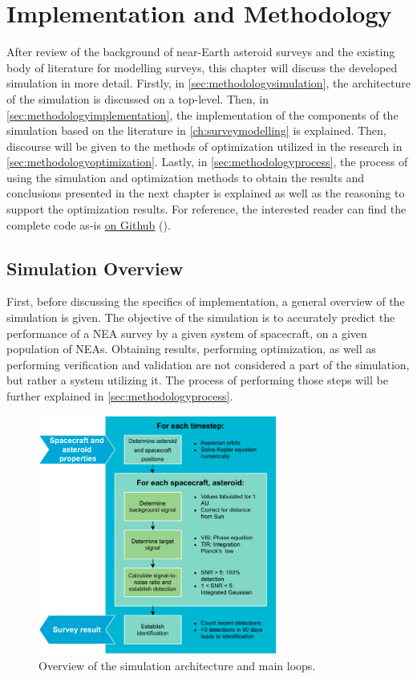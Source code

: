 \chapter{Implementation and Methodology}
\label{ch:experimental}
After review of the background of near-Earth asteroid surveys and the existing body of literature for modelling surveys, this chapter will discuss the developed simulation in more detail. Firstly, in \autoref{sec:methodologysimulation}, the architecture of the simulation is discussed on a top-level. Then, in \autoref{sec:methodologyimplementation}, the implementation of the components of the simulation based on the literature in \autoref{ch:surveymodelling} is explained. Then, discourse will be given to the methods of optimization utilized in the research in \autoref{sec:methodologyoptimization}. Lastly, in \autoref{sec:methodologyprocess}, the process of using the simulation and optimization methods to obtain the results and conclusions presented in the next chapter is explained as well as the reasoning to support the optimization results. For reference, the interested reader can find the complete code as-is \href{https://github.com/ArjanVermeulen97/thesis-code.git}{on Github} (\cite{GitHub}).

\section{Simulation Overview}
\label{sec:methodologysimulation}
First, before discussing the specifics of implementation, a general overview of the simulation is given. The objective of the simulation is to accurately predict the performance of a NEA survey by a given system of spacecraft, on a given population of NEAs. Obtaining results, performing optimization, as well as performing verification and validation are not considered a part of the simulation, but rather a system utilizing it. The process of performing those steps will be further explained in \autoref{sec:methodologyprocess}.\\

\begin{figure}[htbp]
 \centering
 \includegraphics[width=0.7\textwidth]{img/simulation_overview.pdf}
 \caption{Overview of the simulation architecture and main loops.}
 \label{fig:simulation_overview}
\end{figure}

